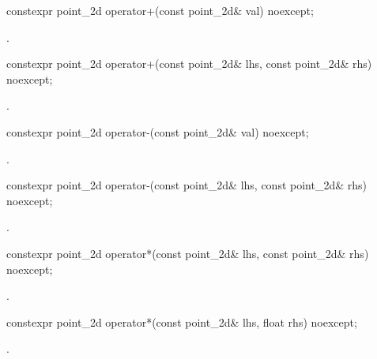 %
\begin{itemdecl}
constexpr point_2d operator+(const point_2d& val) noexcept;
\end{itemdecl}
\begin{itemdescr}
\pnum
\returns
{}.
\end{itemdescr}

%
\begin{itemdecl}
constexpr point_2d operator+(const point_2d& lhs, const point_2d& rhs) 
  noexcept;
\end{itemdecl}
\begin{itemdescr}
\pnum
\returns
{}.
\end{itemdescr}

%
\begin{itemdecl}
constexpr point_2d operator-(const point_2d& val) noexcept;
\end{itemdecl}
\begin{itemdescr}
\pnum
\returns
{}.
\end{itemdescr}

%
\begin{itemdecl}
constexpr point_2d operator-(const point_2d& lhs, const point_2d& rhs) 
  noexcept;
\end{itemdecl}
\begin{itemdescr}
\pnum
\returns
{}.
\end{itemdescr}

%
\begin{itemdecl}
constexpr point_2d operator*(const point_2d& lhs, const point_2d& rhs) 
  noexcept;
\end{itemdecl}
\begin{itemdescr}
\pnum
\returns
{}.
\end{itemdescr}

%
\begin{itemdecl}
constexpr point_2d operator*(const point_2d& lhs, float rhs) noexcept;
\end{itemdecl}
\begin{itemdescr}
\pnum
\returns
{}.
\end{itemdescr}

